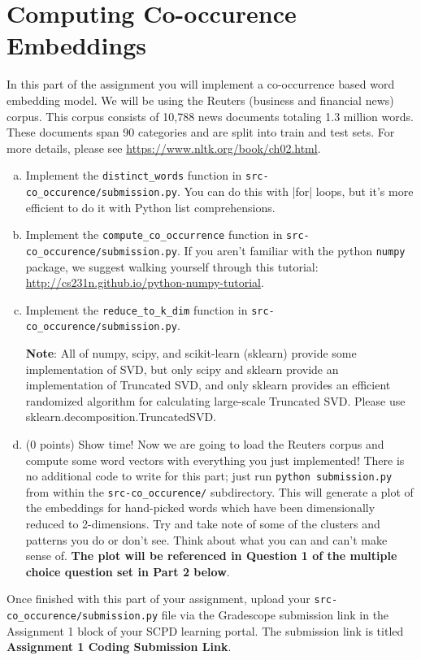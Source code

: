 \section{Computing Co-occurence Embeddings}
In this part of the assignment you will implement a co-occurrence based word embedding model. We will be using the Reuters (business and financial news) corpus. This corpus consists of 10,788 news documents totaling 1.3 million words. These documents span 90 categories and are split into train and test sets. For more details, please see \url{https://www.nltk.org/book/ch02.html}. \newline

\begin{enumerate}[(a)]
    \item {} Implement the \texttt{distinct\_words} function in \texttt{src-co\_occurence/submission.py}. You can do this with |for| loops, but it's more efficient to do it with Python list comprehensions.
    
    \item {} Implement the \texttt{compute\_co\_occurrence} function in \texttt{src-co\_occurence/submission.py}. If you aren't familiar with the python \texttt{numpy} package, we suggest walking yourself through this tutorial: \url{http://cs231n.github.io/python-numpy-tutorial}. 
    
    \item {} Implement the \texttt{reduce\_to\_k\_dim} function in \texttt{src-co\_occurence/submission.py}. \newline
    
    \textbf{Note}: All of numpy, scipy, and scikit-learn (sklearn) provide some implementation of SVD, but only scipy and sklearn provide an implementation of Truncated SVD, and only sklearn provides an efficient randomized algorithm for calculating large-scale Truncated SVD. Please use sklearn.decomposition.TruncatedSVD.
    
    \item (0 points) Show time! Now we are going to load the Reuters corpus and compute some word vectors with everything you just implemented! There is no additional code to write for this part; just run \texttt{python submission.py} from within the \texttt{src-co\_occurence/} subdirectory. This will generate a plot of the embeddings for hand-picked words which have been dimensionally reduced to 2-dimensions. Try and take note of some of the clusters and patterns you do or don't see. Think about what you can and can't make sense of. \textbf{The plot will be referenced in Question 1 of the multiple choice question set in Part 2 below}. 
\end{enumerate}

Once finished with this part of your assignment, upload your \texttt{src-co\_occurence/submission.py} file via the Gradescope submission link in the Assignment 1 block of your SCPD learning portal. The submission link is titled \textbf{Assignment 1 Coding Submission Link}.
